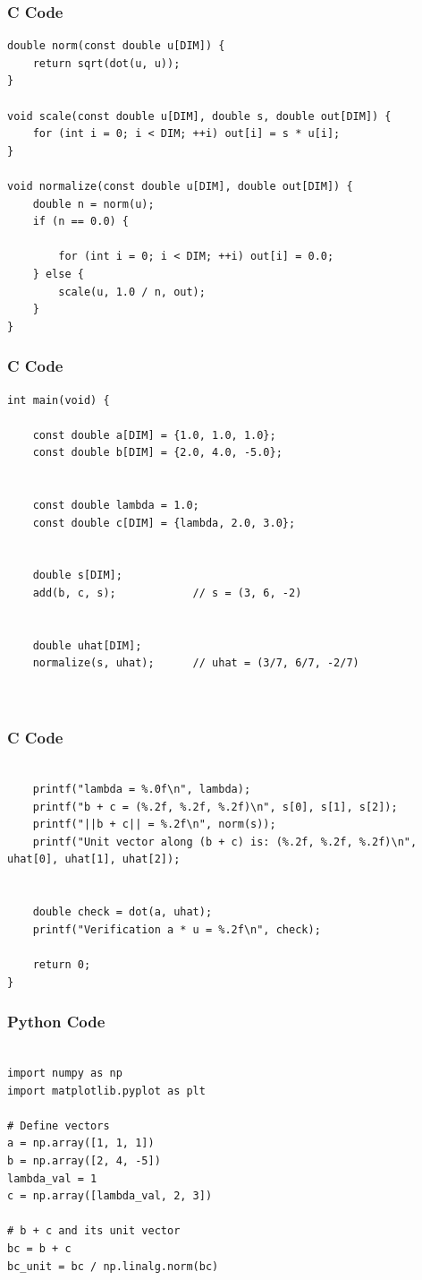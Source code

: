 \documentclass{beamer}
\begin{document}
\begin{frame}[fragile]
    \frametitle{C Code}
    \begin{lstlisting}
double norm(const double u[DIM]) {
    return sqrt(dot(u, u));
}

void scale(const double u[DIM], double s, double out[DIM]) {
    for (int i = 0; i < DIM; ++i) out[i] = s * u[i];
}

void normalize(const double u[DIM], double out[DIM]) {
    double n = norm(u);
    if (n == 0.0) {
         
        for (int i = 0; i < DIM; ++i) out[i] = 0.0;
    } else {
        scale(u, 1.0 / n, out);
    }
}
    \end{lstlisting}
\end{frame}


\begin{frame}[fragile]
    \frametitle{C Code}
    \begin{lstlisting}
int main(void) {
    
    const double a[DIM] = {1.0, 1.0, 1.0};
    const double b[DIM] = {2.0, 4.0, -5.0};

    
    const double lambda = 1.0;
    const double c[DIM] = {lambda, 2.0, 3.0};

    
    double s[DIM];
    add(b, c, s);            // s = (3, 6, -2)

    
    double uhat[DIM];
    normalize(s, uhat);      // uhat = (3/7, 6/7, -2/7)

    

    \end{lstlisting}
\end{frame}


\begin{frame}[fragile]
    \frametitle{C Code}
    \begin{lstlisting}

    printf("lambda = %.0f\n", lambda);
    printf("b + c = (%.2f, %.2f, %.2f)\n", s[0], s[1], s[2]);
    printf("||b + c|| = %.2f\n", norm(s));
    printf("Unit vector along (b + c) is: (%.2f, %.2f, %.2f)\n", uhat[0], uhat[1], uhat[2]);

    
    double check = dot(a, uhat);
    printf("Verification a * u = %.2f\n", check);

    return 0;
}
    \end{lstlisting}
\end{frame}


\begin{frame}[fragile]
    \frametitle{Python Code}
    \begin{lstlisting}

import numpy as np
import matplotlib.pyplot as plt

# Define vectors
a = np.array([1, 1, 1])
b = np.array([2, 4, -5])
lambda_val = 1
c = np.array([lambda_val, 2, 3])

# b + c and its unit vector
bc = b + c
bc_unit = bc / np.linalg.norm(bc)

\end{lstlisting}
\end{frame}
\end{document}

